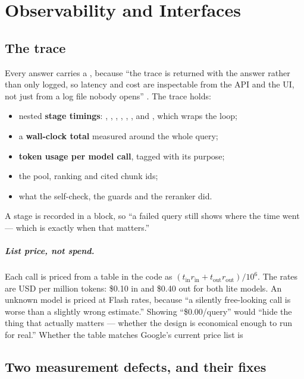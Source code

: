 \chapter{Observability and Interfaces}
\label{ch:serving}

\section{The trace}
\label{sec:trace}

Every answer carries a , because ``the trace is returned with the answer rather than only logged, so latency and cost are inspectable from the API and the UI, not just from a log file nobody opens'' . The trace holds:
\begin{itemize}
  \item nested \textbf{stage timings}: , , , , , , and , which wraps the loop;
  \item a \textbf{wall-clock total} measured around the whole query;
  \item \textbf{token usage per model call}, tagged with its purpose;
  \item the pool, ranking and cited chunk ids;
  \item what the self-check, the guards and the reranker did.
\end{itemize}
A stage is recorded in a  block, so ``a failed query still shows where the time went --- which is exactly when that matters.''

\paragraph{List price, not spend.} Each call is priced from a table in the code as $(t_{\text{in}}r_{\text{in}} + t_{\text{out}}r_{\text{out}})/10^6$. The rates are USD per million tokens: \$0.10 in and \$0.40 out for both lite models. An unknown model is priced at Flash rates, because ``a silently free-looking call is worse than a slightly wrong estimate.'' Showing ``\$0.00/query'' would ``hide the thing that actually matters --- whether the design is economical enough to run for real.'' Whether the table matches Google's current price list is \NotDet

\section{Two measurement defects, and their fixes}
\label{sec:latency-bug}
\label{sec:token-bug}


